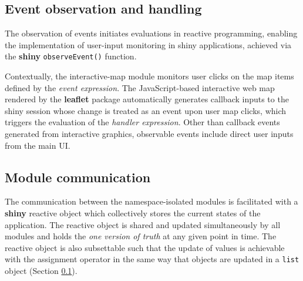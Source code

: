 \documentclass{aucklandthesis}
\begin{document}
\hypertarget{sec:shiny-event}{%
\subsection{Event observation and handling}\label{sec:shiny-event}}

The observation of events initiates evaluations in reactive programming, enabling the implementation of user-input monitoring in shiny applications, achieved via the \textbf{shiny} \texttt{observeEvent()} function.

\begin{Shaded}
\begin{Highlighting}[]
\StringTok{ }
\StringTok{ }
    \NormalTok{(input[[}\NormalTok{]], \{}
\NormalTok{      state[[}\NormalTok{]] <-}\StringTok{ }\NormalTok{input[[}\NormalTok{]][[}\NormalTok{]]}
\NormalTok{    \})}
\NormalTok{  \}}
\NormalTok{\}}
\end{Highlighting}
\end{Shaded}

Contextually, the interactive-map module monitors user clicks on the map items defined by the \emph{event expression}. The JavaScript-based interactive web map rendered by the \textbf{leaflet} package \autocite{leaflet} automatically generates callback inputs to the shiny session whose change is treated as an event upon user map clicks, which triggers the evaluation of the \emph{handler expression}. Other than callback events generated from interactive graphics, observable events include direct user inputs from the main UI.

\hypertarget{module-communication}{%
\subsection{Module communication}\label{module-communication}}

The communication between the namespace-isolated modules is facilitated with a \textbf{shiny} reactive object which collectively stores the current states of the application. The reactive object is shared and updated simultaneously by all modules and holds the \emph{one version of truth} at any given point in time. The reactive object is also subsettable such that the update of values is achievable with the assignment operator in the same way that objects are updated in a \texttt{list} object (Section \ref{sec:shiny-event}).
\end{document}
